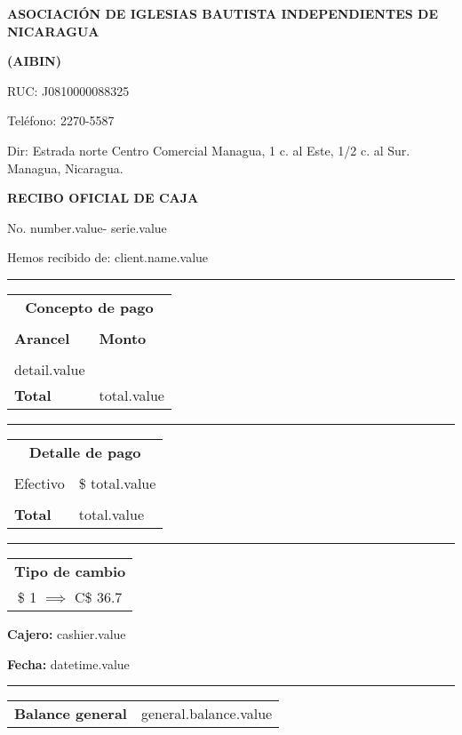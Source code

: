 \documentclass[11pt]{article}
\newcommand{\cashier}{cashier.value}
\newcommand{\datetime}{datetime.value}
\newcommand{\clientName}{client.name.value}
\newcommand{\thenumber}{number.value}
\newcommand{\theserie}{serie.value}
\newcommand{\total}{total.value}
\newcommand{\generalBalance}{general.balance.value}
\newcommand{\detail}{detail.value}
\begin{document}
    \begin{center}
        \textbf{ASOCIACIÓN DE IGLESIAS BAUTISTA INDEPENDIENTES DE NICARAGUA}\par
        \textbf{(AIBIN)}\par
        {
            \small
            RUC: J0810000088325\par
            Teléfono: 2270-5587\par
            Dir: Estrada norte Centro Comercial Managua, 1 c. al Este, 1/2 c. al Sur. Managua, Nicaragua.\par
        }
        \textbf{RECIBO OFICIAL DE CAJA}\par
        No. \thenumber - \theserie
    \end{center}
    Hemos recibido de: \clientName\par
    
    \begin{table}[H]
        \centering
        \hrule
        \begin{tabular}{p{4cm} p{2cm}}
            \multicolumn{2}{c}{\textbf{Concepto de pago}} \\\\
            \textbf{Arancel} & \textbf{Monto} \\\\
            \detail
            \\\textbf{Total} & \total
        \end{tabular}
        \hrule
        \begin{tabular}{p{4cm} p{2cm}}
            \multicolumn{2}{c}{\textbf{Detalle de pago}} \\\\
            Efectivo & \$ \total\\
            \\\textbf{Total} & \total
        \end{tabular}
        \hrule
        \begin{tabular}{c}
            \textbf{Tipo de cambio}\\
            \$ 1 $\implies$ C\$ 36.7
        \end{tabular}
    \end{table}
    \textbf{Cajero:} \cashier\par
    \textbf{Fecha:} \datetime

    \begin{table}[H]
        \centering
        \hrule
        \begin{tabular}{p{3.5cm} p{2.5cm}}
            \textbf{Balance general} & \generalBalance
        \end{tabular}
    \end{table}
\end{document}
